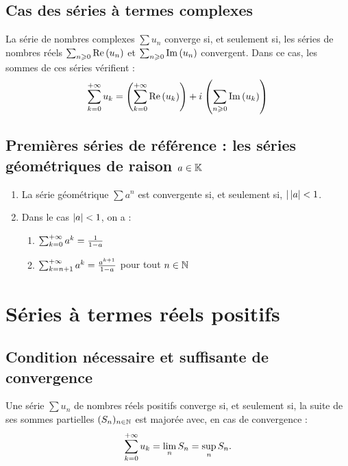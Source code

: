 \subsection{Cas des séries à termes complexes}
\begin{defprop}
    La série de nombres complexes \(\sum u_n \) converge si, et seulement si, les séries de nombres réels \(\sum_{n\geqslant 0}\operatorname{Re}\left(u_n\right)\) et \(\sum_{n\geqslant 0}\operatorname{Im}\left(u_n\right)\) convergent. Dans ce cas, les sommes de ces séries vérifient :
    \[\sum^{+\infty}_{k=0}u_k = \left(\sum^{+\infty}_{k=0}\operatorname{Re}\left(u_k\right)\right) + i\mkern1mu \left(\sum_{n\geqslant 0}\operatorname{Im}\left(u_k\right)\right)\]
\end{defprop}
\subsection{Premières séries de référence : les séries géométriques de raison \(a \in  \mathbb{K}\)}
\begin{defprop}
    \begin{enumerate}
        \item La série géométrique \(\sum a^n\) est convergente si, et seulement si, \(|\left\lvert a\right\rvert < 1\).
        \item Dans le cas \(\left\lvert a\right\rvert < 1\), on a :
        \begin{enumerate}
             \item \(\sum^{+\infty}_{k=0}a^k = \frac{1}{1 - a}\)
             \item\(\sum^{+\infty}_{k=n+1}a^k = \frac{a^{k+1}}{1 - a}\) pour tout \(n \in \mathbb{N}\)
        \end{enumerate}
    \end{enumerate}
\end{defprop}

\section{Séries à termes réels positifs}
\subsection{Condition nécessaire et suffisante de convergence}
\begin{defprop}
    Une série \(\sum u_n \) de nombres réels positifs converge si, et seulement si, la suite de ses sommes partielles \((S_n)_{n \in \mathbb{N}}\) est majorée avec, en cas de convergence :
\[\sum^{+\infty}_{k=0}u_k = \lim_{n} S_n = \sup_{n}S_n.\]
\end{defprop}

